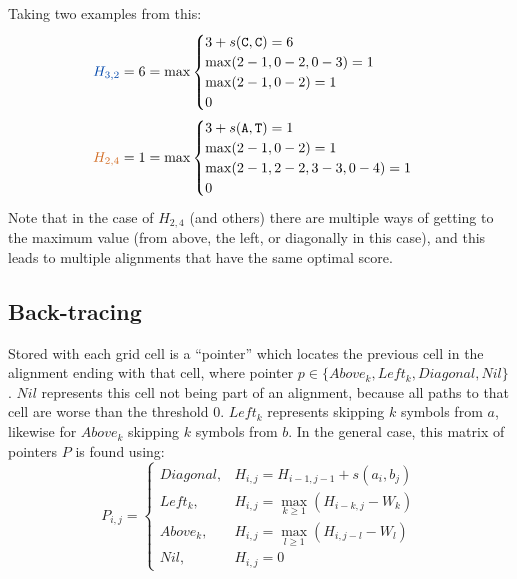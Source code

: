 Taking two examples from this:
\begin{align*}
{\color{darkblue}H_{3,2}} = 6 &= \max \begin{cases}
    3 + s(\text{\ttfamily C}, \text{\ttfamily C}) =6\\
    \max(2-1, 0 - 2, 0-3) =1 \\
    \max(2-1, 0 - 2) =1\\
    0
\end{cases} \\
{\color{darkorange} H_{2,4}} = 1 &= \max \begin{cases}
    3 + s(\text{\ttfamily A}, \text{\ttfamily T}) =1 \\
    \max(2-1, 0 - 2) =1 \\
    \max(2-1, 2 - 2, 3-3, 0-4) =1 \\
    0
\end{cases}
\end{align*}
Note that in the case of $H_{2,4}$ (and others) there are multiple ways of getting to the maximum value (from above, the left, or diagonally in this case), and this leads to multiple alignments that have the same optimal score.

\subsection{Back-tracing}
\label{sec:SW_Back_tracing}
Stored with each grid cell is a ``pointer'' which locates the previous cell in the alignment ending with that cell, where pointer $p \in \{Above_k, Left_k, Diagonal, Nil\}$. $Nil$ represents this cell not being part of an alignment, because all paths to that cell are worse than the threshold $0$. $Left_k$ represents skipping $k$ symbols from $a$, likewise for $Above_k$ skipping $k$ symbols from $b$. In the general case, this matrix of pointers $P$ is found using:
$$ P_{i,j} = \begin{cases}
    Diagonal, & H_{i,j} = H_{i-1,j-1} + s(a_i, b_j) \\
    Left_k, & H_{i,j} = \max_{k \geq 1}(H_{i-k,j} - W_k) \\
    Above_k, & H_{i,j} = \max_{l \geq 1}(H_{i,j-l} - W_l) \\
    Nil, & H_{i,j} = 0
\end{cases}$$
\pagebreak

